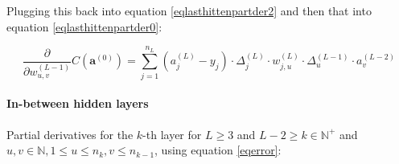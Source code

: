 \documentclass[titlepage]{article}
\begin{document}
          Plugging this back into equation \ref{eqlasthittenpartder2} and then
          that into equation \ref{eqlasthittenpartder0}:

          \begin{equation}
            \frac{\partial}{\partial w_{u,v}^{(L-1)}}
              C \left( \mathbf{a}^{(0)} \right)
                = \sum_{j=1}^{n_L}
                    \left( a_j^{(L)} - y_j \right)
                    \cdot
                    \Delta_j^{(L)}
                    \cdot
                    w_{j,u}^{(L)}
                    \cdot
                    \Delta_u^{(L-1)}
                    \cdot
                    a_{v}^{(L-2)}
          \end{equation}

        \paragraph{In-between hidden layers}

          Partial derivatives for the $k$-th layer for $L \geq 3$ and
          $L-2 \geq k \in \mathbb{N}^+$ and
          $u, v \in \mathbb{N}, 1 \leq u \leq n_k, v \leq n_{k - 1}$,
          using equation \ref{eqerror}:
\end{document}
